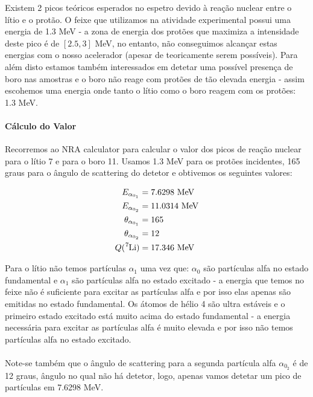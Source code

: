 \documentclass{article}
\begin{document}
\begin{multicols}{2}
Existem 2 picos teóricos esperados no espetro devido à reação nuclear entre o lítio e o protão.
O feixe que utilizamos na atividade experimental possui uma energia de 1.3 MeV - a zona de energia dos protões que maximiza a intensidade deste pico é de $[2.5,3]$ MeV, no entanto, não conseguimos alcançar estas energias com o nosso acelerador (apesar de teoricamente serem possíveis). 
Para além disto estamos também interessados em detetar uma possível presença de boro nas amostras e o boro não reage com protões de tão elevada energia - assim escohemos uma energia onde tanto o lítio como o boro reagem com os protões: 1.3 MeV.

\paragraph*{Cálculo do Valor}

Recorremos ao NRA calculator para calcular o valor dos picos de reação nuclear para o lítio 7 e para o boro 11.
Usamos 1.3 MeV para os protões incidentes, 165 graus para o ângulo de scattering do detetor e obtivemos os seguintes valores:

\begin{equation}
\begin{split}
  E_{\alpha_{0_1}} &= 7.6298 \text{ MeV} \\
  E_{\alpha_{0_2}} &= 11.0314 \text{ MeV} \\
  \theta_{\alpha_{0_1}} &= 165 \\
  \theta_{\alpha_{0_2}} &= 12 \\
  Q (\ce{^7Li}) &= 17.346 \text{ MeV} \\
\end{split}
\label{eq:energiesli}
\end{equation}

Para o lítio não temos partículas $\alpha_1$ uma vez que: $\alpha_0$ são partículas alfa no estado fundamental e $\alpha_1$ são partículas alfa no estado excitado - a energia que temos no feixe não é suficiente para excitar as partículas alfa e por isso elas apenas são emitidas no estado fundamental.
Os átomos de hélio 4 são ultra estáveis e o primeiro estado excitado está muito acima do estado fundamental - a energia necessária para excitar as partículas alfa é muito elevada e por isso não temos partículas alfa no estado excitado.
\paragraph{} Note-se também que o ângulo de scattering para a segunda partícula alfa $\alpha_{0_2}$ é de 12 graus, ângulo no qual não há detetor, logo, apenas vamos detetar um pico de partículas em 7.6298 MeV.


\end{multicols}
\end{document}
